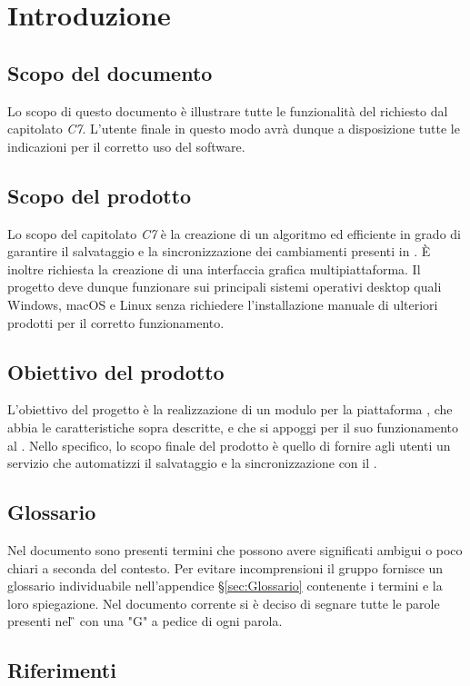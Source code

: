 \section{Introduzione}
\subsection{Scopo del documento}
Lo scopo di questo documento è illustrare tutte le funzionalità del  richiesto dal capitolato \textit{C7}. L'utente finale in questo modo avrà dunque a disposizione tutte le indicazioni per il corretto uso del software.

\subsection{Scopo del prodotto}
Lo scopo del capitolato \textit{C7} è la creazione di un algoritmo  ed efficiente in grado di garantire il salvataggio e la sincronizzazione dei cambiamenti presenti in . È inoltre richiesta la creazione di una interfaccia grafica multipiattaforma. Il progetto deve dunque funzionare sui principali sistemi operativi desktop quali Windows, macOS e Linux senza richiedere l'installazione manuale di ulteriori prodotti per il corretto funzionamento. 
\subsection{Obiettivo del prodotto}
L'obiettivo del progetto è la realizzazione di un modulo per la piattaforma , che abbia le caratteristiche sopra descritte, e che si appoggi per il suo funzionamento al  .
Nello specifico, lo scopo finale del prodotto è quello di fornire agli utenti un servizio che automatizzi il salvataggio e la sincronizzazione con il .

\subsection{Glossario}
Nel documento sono presenti termini che possono avere significati ambigui o poco chiari a seconda del contesto. Per evitare incomprensioni il gruppo fornisce un glossario individuabile nell'appendice \S{}\ref{sec:Glossario} contenente i termini e la loro spiegazione.\newline{}
Nel documento corrente si è deciso di segnare tutte le parole presenti nel \G{} con una "G" a pedice di ogni parola.
\subsection{Riferimenti}
